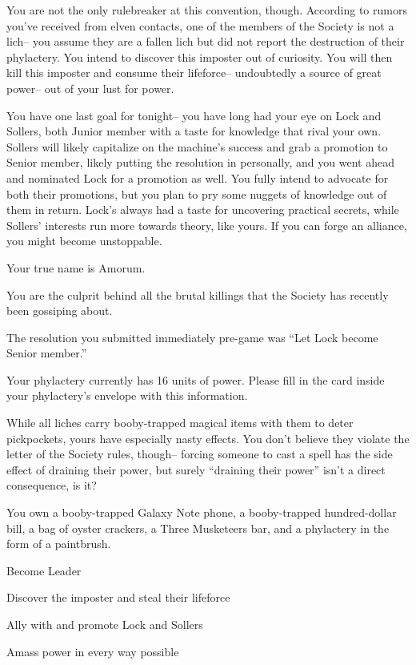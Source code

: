 \documentclass[char]{Sel}
\begin{document}
You are not the only rulebreaker at this convention, though. According to rumors you've received from elven contacts, one of the members of the Society is not a lich-- you assume they are a fallen lich but did not report the destruction of their phylactery. You intend to discover this imposter out of curiosity. You will then kill this imposter and consume their lifeforce-- undoubtedly a source of great power-- out of your lust for power.

You have one last goal for tonight-- you have long had your eye on Lock and Sollers, both Junior member with a taste for knowledge that rival your own. Sollers will likely capitalize on the machine's success and grab a promotion to Senior member, likely putting the resolution in personally, and you went ahead and nominated Lock for a promotion as well. You fully intend to advocate for both their promotions, but you plan to pry some nuggets of knowledge out of them in return. Lock's always had a taste for uncovering practical secrets, while Sollers' interests run more towards theory, like yours. If you can forge an alliance, you might become unstoppable.

\begin{itemz}[Notes]
  \item Your true name is Amorum.
    \item You are the culprit behind all the brutal killings that the Society has recently been gossiping about.
  \item The resolution you submitted immediately pre-game was ``Let Lock become Senior member.''
      \item Your phylactery currently has 16 units of power. Please fill in the card inside your phylactery's envelope with this information.
   \item While all liches carry booby-trapped magical items with them to deter pickpockets, yours have especially nasty effects. You don't believe they violate the letter of the Society rules, though-- forcing someone to cast a spell has the side effect of draining their power, but surely ``draining their power'' isn't a direct consequence, is it?
\item You own a booby-trapped Galaxy Note phone, a booby-trapped hundred-dollar bill, a bag of oyster crackers, a Three Musketeers bar, and a phylactery in the form of a paintbrush.
    \end{itemz}
   
    
 \begin{itemz}[Goals]
\item Become Leader
\item Discover the imposter and steal their lifeforce
\item Ally with and promote Lock and Sollers
\item Amass power in every way possible
\end{itemz}
\end{document}

